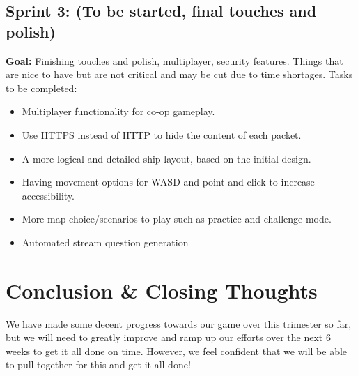 \documentclass{article}
\begin{document}
\subsection*{Sprint 3: (To be started, final touches and polish)}
\textbf{Goal:} Finishing touches and polish, multiplayer, security features. Things that are nice to have but are not critical and may be cut due to time shortages.
\newline\newline
Tasks to be completed:
\begin{itemize}
    \item Multiplayer functionality for co-op gameplay.
    \item Use HTTPS instead of HTTP to hide the content of each packet.
    \item A more logical and detailed ship layout, based on the initial design.
    \item Having movement options for WASD and point-and-click to increase accessibility.
    \item More map choice/scenarios to play such as practice and challenge mode.
    \item Automated stream question generation
\end{itemize}


\section*{Conclusion \& Closing Thoughts}
We have made some decent progress towards our game over this trimester so far, but we will need to greatly improve and ramp up our efforts over the next 6 weeks to get it all done on time. However, we feel confident that we will be able to pull together for this and get it all done!
\end{document}
